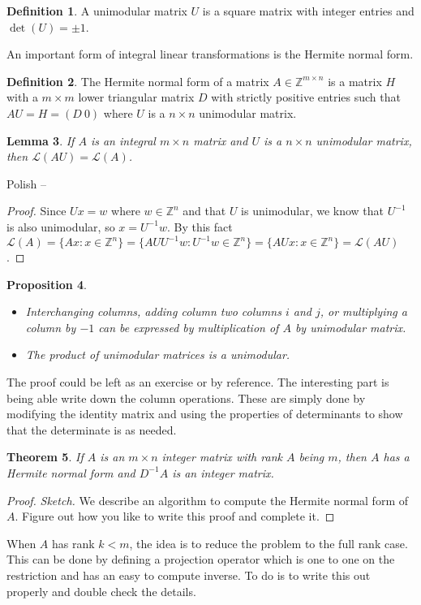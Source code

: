 \documentclass{article}
\newcommand{\Z}[0]{\mathbb{Z}}		%
\newcommand{\La}[0]{\mathcal L}
\newtheorem{thm}{Theorem}[section]
\newtheorem{lem}[thm]{Lemma}
\newtheorem{prop}[thm]{Proposition}
\theoremstyle{definition}
\newtheorem{defn}[thm]{Definition}
\theoremstyle{remark}
\begin{document}
\begin{defn}
A unimodular matrix $U$ is a square matrix with integer entries and $\det(U)=\pm 1$. %
\end{defn}
An important form of integral linear transformations is the Hermite normal form. 
\begin{defn}
The Hermite normal form of a matrix $A\in\Z^{m\times n}$ is a matrix $H$ with a $m\times m$ lower triangular matrix $D$ with strictly positive entries such that $AU = H = (D~0)$ where $U$ is a $n\times n$ unimodular matrix.
\end{defn}
\begin{lem}
If $A$ is an integral $m\times n$ matrix and $U$ is a $n\times n$ unimodular matrix, then $\La(AU) = \La(A)$. 
\end{lem}
{\color{blue}Polish --  
\begin{proof}
 Since $Ux = w$ where $w\in \Z^n$ and that $U$ is unimodular, we know that $U^{-1}$ is also unimodular, so $x = U^{-1}w$. By this fact $\La(A) = \{Ax :x\in \Z^n\} = \{AU U^{-1}w : U^{-1}w\in \Z^n \} =\{AU x : x\in \Z^n \} =\La(AU)$. 
 \end{proof}}
\begin{prop}
\begin{itemize}
    \item Interchanging columns, adding column two columns $i$ and $j$, or multiplying a column by $-1$ can be expressed by multiplication of $A$ by unimodular matrix. 
    \item The product of unimodular matrices is a unimodular. 
\end{itemize}
\end{prop}
The proof could be left as an exercise or by reference. The interesting part is being able write down the column operations. These are simply done by modifying the identity matrix and using the properties of determinants to show that the determinate is as needed. 
\begin{thm}\label{HNF}
If $A$ is an $m\times n$ integer matrix with rank $A$ being $m$, then $A$ has a Hermite normal form and $D^{-1}A$ is an integer matrix. 
\end{thm}
\begin{proof}
\textit{Sketch.}
We describe an algorithm to compute the Hermite normal form of $A$. {\color{blue} Figure out how you like to write this proof and complete it.} 
\end{proof}
{\color{red} When $A$ has rank $k<m$, the idea is to reduce the problem to the full rank case. This can be done by defining a projection operator which is one to one on the restriction and has an easy to compute inverse. To do is to write this out properly and double check the details. }
\end{document}
